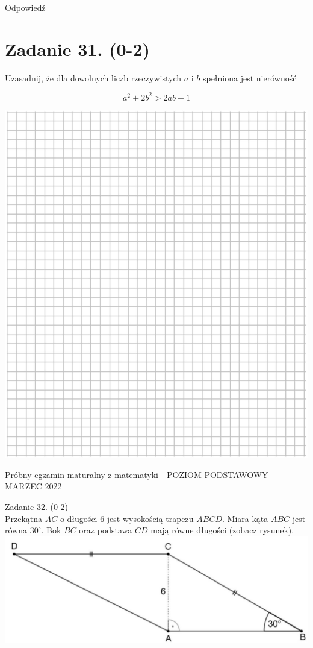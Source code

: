 \documentclass[10pt]{article}
\begin{document}
Odpowiedź \(\qquad\)

\section*{Zadanie 31. (0-2)}
Uzasadnij, że dla dowolnych liczb rzeczywistych \(a\) i \(b\) spełniona jest nierówność

\[
a^{2}+2 b^{2}>2 a b-1
\]

\begin{center}
\includegraphics[max width=\textwidth]{2024_11_21_fd555512e32c497e8a5dg-15}
\end{center}

Próbny egzamin maturalny z matematyki - POZIOM PODSTAWOWY - MARZEC 2022

Zadanie 32. (0-2)\\
Przekątna \(A C\) o długości 6 jest wysokością trapezu \(A B C D\). Miara kąta \(A B C\) jest równa \(30^{\circ}\). Bok \(B C\) oraz podstawa \(C D\) mają równe długości (zobacz rysunek).\\
\includegraphics[max width=\textwidth, center]{2024_11_21_fd555512e32c497e8a5dg-16}
\end{document}
